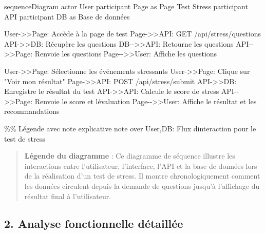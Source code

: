 \documentclass[
]{article}
\newenvironment{Shaded}{}{}
\newcommand{\NormalTok}[1]{#1}
\begin{document}
\begin{Shaded}
\begin{Highlighting}[]
\NormalTok{sequenceDiagram}
\NormalTok{    actor User}
\NormalTok{    participant Page as Page Test Stress}
\NormalTok{    participant API}
\NormalTok{    participant DB as Base de données}
    
\NormalTok{    User{-}\textgreater{}\textgreater{}Page: Accède à la page de test}
\NormalTok{    Page{-}\textgreater{}\textgreater{}API: GET /api/stress/questions}
\NormalTok{    API{-}\textgreater{}\textgreater{}DB: Récupère les questions}
\NormalTok{    DB{-}{-}\textgreater{}\textgreater{}API: Retourne les questions}
\NormalTok{    API{-}{-}\textgreater{}\textgreater{}Page: Renvoie les questions}
\NormalTok{    Page{-}{-}\textgreater{}\textgreater{}User: Affiche les questions}
    
\NormalTok{    User{-}\textgreater{}\textgreater{}Page: Sélectionne les événements stressants}
\NormalTok{    User{-}\textgreater{}\textgreater{}Page: Clique sur "Voir mon résultat"}
\NormalTok{    Page{-}\textgreater{}\textgreater{}API: POST /api/stress/submit}
\NormalTok{    API{-}\textgreater{}\textgreater{}DB: Enregistre le résultat du test}
\NormalTok{    API{-}\textgreater{}\textgreater{}API: Calcule le score de stress}
\NormalTok{    API{-}{-}\textgreater{}\textgreater{}Page: Renvoie le score et l\textquotesingle{}évaluation}
\NormalTok{    Page{-}{-}\textgreater{}\textgreater{}User: Affiche le résultat et les recommandations}
    
\NormalTok{    \%\% Légende avec note explicative}
\NormalTok{    note over User,DB: Flux d\textquotesingle{}interaction pour le test de stress}
\end{Highlighting}
\end{Shaded}

\begin{quote}
\textbf{Légende du diagramme} : Ce diagramme de séquence illustre les
interactions entre l’utilisateur, l’interface, l’API et la base de
données lors de la réalisation d’un test de stress. Il montre
chronologiquement comment les données circulent depuis la demande de
questions jusqu’à l’affichage du résultat final à l’utilisateur.
\end{quote}

\subsection{2. Analyse fonctionnelle
détaillée}\label{analyse-fonctionnelle-duxe9tailluxe9e}
\end{document}
